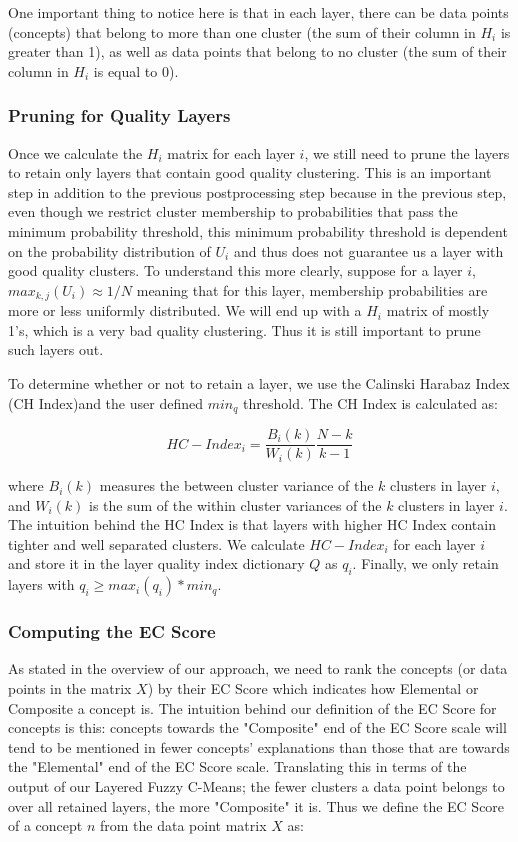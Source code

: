 One important thing to notice here is that in each layer, there can be data points (concepts) that belong to more than one cluster (the sum of their column in $H_{i}$ is greater than 1), as well as data points that belong to no cluster (the sum of their column in $H_{i}$ is equal to 0).

\subsubsection{Pruning for Quality Layers}\label{pruning_layers}
Once we calculate the $H_{i}$ matrix for each layer $i$, we still need to prune the layers to retain only layers that contain good quality clustering. This is an important step in addition to the previous postprocessing step because in the previous step, even though we restrict cluster membership to probabilities that pass the minimum probability threshold, this minimum probability threshold is dependent on the probability distribution of $U_{i}$ and thus does not guarantee us a layer with good quality clusters. To understand this more clearly, suppose for a layer $i$, $max_{k,j}(U_{i}) \approx 1/N$ meaning that for this layer, membership probabilities are more or less uniformly distributed. We will end up with a $H_{i}$ matrix of mostly 1's, which is a very bad quality clustering. Thus it is still important to prune such layers out.

To determine whether or not to retain a layer, we use the Calinski Harabaz Index (CH Index)and the user defined $min_q$ threshold. The CH Index is calculated as:

\begin{equation}
HC-Index_{i} = \frac{B_{i}(k)}{W_{i}(k)}\frac{N-k}{k-1}
\end{equation}

where $B_{i}(k)$ measures the between cluster variance of the $k$ clusters in layer $i$, and $W_{i}(k)$ is the sum of the within cluster variances of the $k$ clusters in layer $i$. The intuition behind the HC Index is that layers with higher HC Index contain tighter and well separated clusters.
We calculate $HC-Index_{i}$ for each layer $i$ and store it in the layer quality index dictionary $Q$ as $q_{i}$. Finally, we only retain layers with $q_{i} \geq max_{i}(q_{i}) * min_q$.

\subsubsection{Computing the EC Score}\label{calc_ec}
As stated in the overview of our approach, we need to rank the concepts (or data points in the matrix $X$) by their EC Score which indicates how Elemental or Composite a concept is. The intuition behind our definition of the EC Score for concepts is this: concepts towards the "Composite" end of the EC Score scale will tend to be mentioned in fewer concepts' explanations than those that are towards the "Elemental" end of the EC Score scale. Translating this in terms of the output of our Layered Fuzzy C-Means; the fewer clusters a data point belongs to over all retained layers, the more "Composite" it is. Thus we define the EC Score of a concept $n$ from the data point matrix $X$ as:

